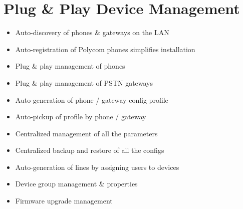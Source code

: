 \documentclass[letterpaper,10pt,english]{sphinxmanual}
\begin{document}
\section{Plug \& Play Device Management}
\label{\detokenize{features:plug-play-device-management}}\begin{itemize}
\item {} 
Auto-discovery of phones \& gateways on the LAN

\item {} 
Auto-registration of Polycom phones simplifies installation

\item {} 
Plug \& play management of phones

\item {} 
Plug \& play management of PSTN gateways

\item {} 
Auto-generation of phone / gateway config profile

\item {} 
Auto-pickup of profile by phone / gateway

\item {} 
Centralized management of all the parameters

\item {} 
Centralized backup and restore of all the configs

\item {} 
Auto-generation of lines by assigning users to devices

\item {} 
Device group management \& properties

\item {} 
Firmware upgrade management

\end{itemize}
\end{document}
